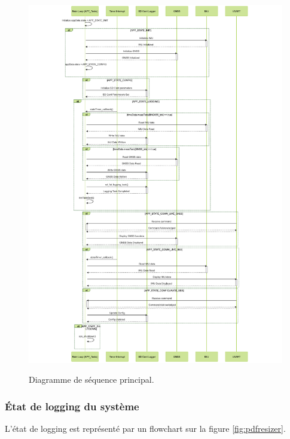 \begin{figure}[!h]
	\centering
\	\includegraphics[width=.96\linewidth]{../figures/code/diagrammes/sequence-app}
	\caption{Diagramme de séquence principal.}
	\label{fig:sequence-app}
\end{figure}

\clearpage
\subsubsection{État de logging du système}
L'état de logging est représenté par un flowchart sur la figure \ref{fig:pdfresizer}.

